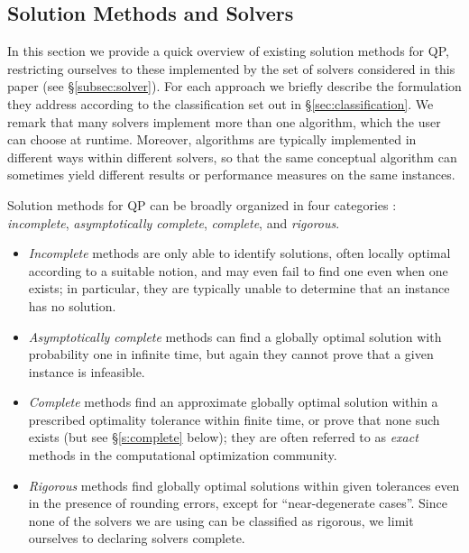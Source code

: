 
\subsection{Solution Methods and Solvers}\label{sec:algo}

In this section we provide a quick overview of existing solution methods for QP, restricting ourselves to these implemented by the set of solvers considered in this paper (see \S\ref{subsec:solver}). For each approach we briefly describe  the formulation they address according to the classification set out in \S\ref{sec:classification}. We remark that many solvers implement more than one algorithm, which the user can choose at runtime. Moreover, algorithms are typically implemented in different ways within different solvers, so that the same conceptual algorithm can sometimes yield different results or performance measures on the same instances.

  Solution methods for QP can be broadly organized in four categories \cite{neumaier}: \emph{incomplete}, \emph{asymptotically complete}, \emph{complete}, and \emph{rigorous}.
  \begin{itemize}
  \item \textit{Incomplete} methods are only able to identify solutions, often locally optimal according to a suitable notion, and may even fail to find one even when one exists; in particular, they are typically unable to determine that an instance has no solution.
  \item \textit{Asymptotically complete} methods can find a globally optimal solution with probability one in infinite time, but again they cannot prove that a given instance is infeasible.
  \item \textit{Complete} methods find an approximate globally optimal solution within a prescribed optimality tolerance within finite time, or prove that none such exists (but see \S\ref{s:complete} below); they are often referred to as \emph{exact} methods in the computational optimization community.
  \item \textit{Rigorous} methods find globally optimal solutions within given tolerances even in the presence of rounding errors, except for ``near-degenerate cases''. Since none of the solvers we are using can be classified as rigorous, we limit ourselves to declaring solvers complete.
  \end{itemize}

